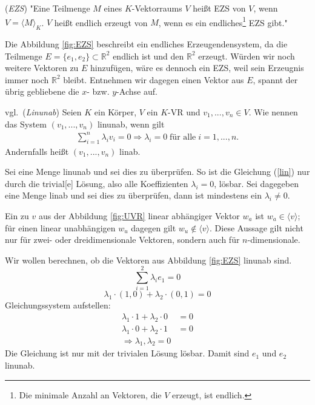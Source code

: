 \begin{definition}\cite[S. 39, 9.4]{Skript} (\emph{\acl{EZS}}) "Eine Teilmenge $M$ eines $K$-Vektorraums $V$ heißt \acl{EZS} von $V$, wenn $V = \langle M \rangle_K$. $V$ heißt endlich erzeugt von $M$, wenn es ein endliches\footnote{Die minimale Anzahl an Vektoren, die $V$ erzeugt, ist endlich.} \acl{EZS} gibt."
\end{definition}

\begin{example}
Die Abbildung \ref{fig:EZS} beschreibt ein endliches Erzeugendensystem, da die Teilmenge $E=\{e_1, e_2\} \subset \mathbb{R}^2$ endlich ist und den $\mathbb{R}^2$ erzeugt. Würden wir noch weitere Vektoren zu $E$ hinzufügen, wäre es dennoch ein \acl{EZS}, weil sein Erzeugnis immer noch $\mathbb{R}^2$ bleibt. Entnehmen wir dagegen einen Vektor aus $E$, spannt der übrig gebliebene die $x$- bzw. $y$-Achse auf.  
\end{example}
\newpage
\theoremstyle{definition}
\begin{definition}vgl.\, \cite[S. 298, 16.5]{Tut} ({\emph{\acl{Linunab}}}) \label{def:linunab} Seien $K$ ein Körper, $V$ ein $K$-\acl{VR} und $v_1, ..., v_n \in V$. Wie nennen das System \((v_1, ..., v_n)\) \acl{linunab}, wenn gilt
	\begin{align}\sum \limits_{i=1}^{n} \lambda_i v_i = 0 \Longrightarrow \lambda_i = 0 \; \text{für alle}\; i=1,...,n \text{.}\label{lin}\end{align}
	Andernfalls heißt \( (v_1, ..., v_n)\) \acl{linab}.
\end{definition}

Sei eine Menge \acl{linunab} und sei dies zu überprüfen. So ist die Gleichung (\ref{lin}) nur durch die {\glqq}trivial[e]{\grqq} \cite[S. 307, 16.5]{Tut} Lösung, also alle Koeffizienten $\lambda_i = 0$, lösbar.
Sei dagegeben eine Menge \acl{linab} und sei dies zu überprüfen, dann ist mindestens ein $\lambda_i\not= 0$.

\begin{example}
Ein zu $v$ aus der Abbildung \ref{fig:UVR} linear abhängiger Vektor $w_a$ ist $w_a\in \langle v \rangle$; für einen linear unabhängigen $w_u$ dagegen gilt $w_u \notin \langle v \rangle$. Diese Aussage gilt nicht nur für zwei- oder dreidimensionale Vektoren, sondern auch für $n$-dimensionale. 
\end{example}

\begin{example}
\label{lu}
Wir wollen berechnen, ob die Vektoren aus Abbildung \ref{fig:EZS} \acl{linunab} sind.
\[\sum \limits_{i=1}^{2} \lambda_i e_1=0\]
\[ \lambda_1 \cdot (1,0) + \lambda_2 \cdot (0,1) = 0\]
Gleichungssystem aufstellen:
\begin{align*}
\lambda_1 \cdot 1 + \lambda_2 \cdot 0 &= 0
\\ \lambda_1 \cdot 0 + \lambda_2 \cdot 1 &= 0
\\ \Rightarrow \lambda_1, \lambda_2= 0
\end{align*} 
Die Gleichung ist nur mit der trivialen Lösung lösbar. Damit sind $e_1$ und $e_2$ \acl{linunab}.
\end{example}

